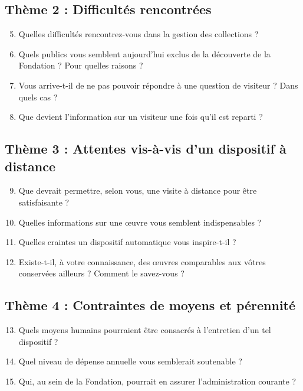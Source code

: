 \subsection*{Thème 2 : Difficultés rencontrées}

\begin{enumerate}\setcounter{enumi}{4}
  \item Quelles difficultés rencontrez-vous dans la gestion des collections ?
  \item Quels publics vous semblent aujourd'hui exclus de la découverte de la
        Fondation ? Pour quelles raisons ?
  \item Vous arrive-t-il de ne pas pouvoir répondre à une question de visiteur ?
        Dans quels cas ?
  \item Que devient l'information sur un visiteur une fois qu'il est reparti ?
\end{enumerate}

\subsection*{Thème 3 : Attentes vis-à-vis d'un dispositif à distance}

\begin{enumerate}\setcounter{enumi}{8}
  \item Que devrait permettre, selon vous, une visite à distance pour être
        satisfaisante ?
  \item Quelles informations sur une œuvre vous semblent indispensables ?
  \item Quelles craintes un dispositif automatique vous inspire-t-il ?
  \item Existe-t-il, à votre connaissance, des œuvres comparables aux vôtres
        conservées ailleurs ? Comment le savez-vous ?
\end{enumerate}

\subsection*{Thème 4 : Contraintes de moyens et pérennité}

\begin{enumerate}\setcounter{enumi}{12}
  \item Quels moyens humains pourraient être consacrés à l'entretien d'un tel
        dispositif ?
  \item Quel niveau de dépense annuelle vous semblerait soutenable ?
  \item Qui, au sein de la Fondation, pourrait en assurer l'administration
        courante ?
\end{enumerate}

